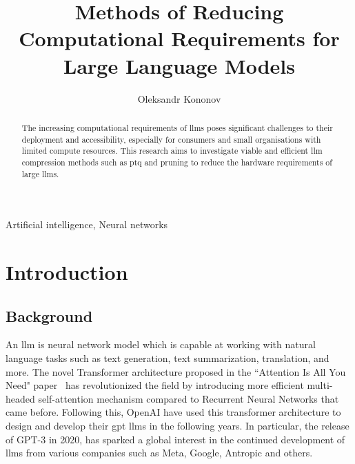 \documentclass{ifacconf}
\begin{document}
	
	\begin{frontmatter}
		
		\title{Methods of Reducing Computational Requirements for Large Language Models} 
		
		\author[First]{Oleksandr Kononov} 
		
		\address[First]{South East Technological University, 
			Cork Road, Waterford, Ireland (e-mail: 20071032@mail.wit.ie).}
		\begin{abstract}                %
			The increasing computational requirements of \glspl{llm} poses significant challenges to their deployment and accessibility, especially for consumers and small organisations with limited compute resources. This research aims to investigate viable and efficient \gls{llm} compression methods such as \gls{ptq} and pruning to reduce the hardware requirements of large \glspl{llm}. 
		\end{abstract}
		
		\begin{keyword}
			Artificial intelligence, Neural networks
		\end{keyword}
		
	\end{frontmatter}
	\section{Introduction}
	\subsection{Background}
	An \gls{llm} is neural network model which is capable at working with natural language tasks such as text generation, text summarization, translation, and more. The novel Transformer architecture proposed in the ``Attention Is All You Need" paper~\cite{vaswani2017attentionneed} has revolutionized the field by introducing more efficient multi-headed self-attention mechanism compared to Recurrent Neural Networks that came before.
	Following this, OpenAI have used this transformer architecture to design and develop their \gls{gpt} \glspl{llm} in the following years. In particular, the release of GPT-3 in 2020, has sparked a global interest in the continued development of \glspl{llm} from various companies such as Meta, Google, Antropic and others.
	
\end{document}
